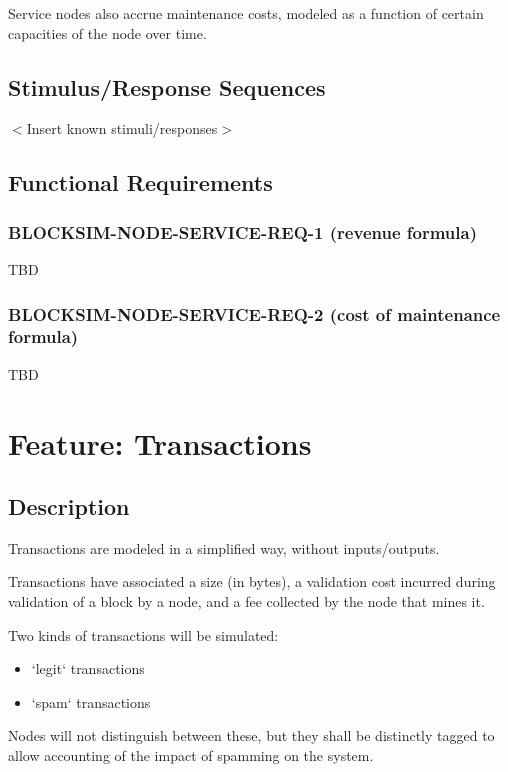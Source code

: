 \documentclass{scrreprt}
\begin{document}
Service nodes also accrue maintenance costs, modeled as a function of certain
capacities of the node over time.


\subsection{Stimulus/Response Sequences}

$<$Insert known stimuli/responses$>$


\subsection{Functional Requirements}

\subsubsection{BLOCKSIM-NODE-SERVICE-REQ-1 (revenue formula)}

TBD


\subsubsection{BLOCKSIM-NODE-SERVICE-REQ-2 (cost of maintenance formula)}

TBD



\section{Feature: Transactions}

\subsection{Description}

Transactions are modeled in a simplified way, without inputs/outputs.

Transactions have associated a size (in bytes), a validation cost incurred
during validation of a block by a node, and a fee collected by the node that
mines it.

Two kinds of transactions will be simulated:

\begin{itemize}
   \item `legit` transactions
   \item `spam` transactions
\end{itemize}

Nodes will not distinguish between these, but they shall be distinctly
tagged to allow accounting of the impact of spamming on the system.
\end{document}
